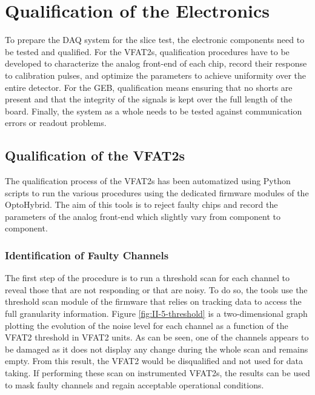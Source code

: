 \chapter{Qualification of the Electronics}
\label{chap:II-5-qualification}

  To prepare the DAQ system for the slice test, the electronic components need to be tested and qualified. For the VFAT2s, qualification procedures have to be developed to characterize the analog front-end of each chip, record their response to calibration pulses, and optimize the parameters to achieve uniformity over the entire detector. For the GEB, qualification means ensuring that no shorts are present and that the integrity of the signals is kept over the full length of the board. Finally, the system as a whole needs to be tested against communication errors or readout problems.

  \section{Qualification of the VFAT2s}

    The qualification process of the VFAT2s has been automatized using Python scripts to run the various procedures using the dedicated firmware modules of the OptoHybrid. The aim of this tools is to reject faulty chips and record the parameters of the analog front-end which slightly vary from component to component.

    \subsection{Identification of Faulty Channels}

      The first step of the procedure is to run a threshold scan for each channel to reveal those that are not responding or that are noisy. To do so, the tools use the threshold scan module of the firmware that relies on tracking data to access the full granularity information. Figure \ref{fig:II-5-threshold} is a two-dimensional graph plotting the evolution of the noise level for each channel as a function of the VFAT2 threshold in VFAT2 units. As can be seen, one of the channels appears to be damaged as it does not display any change during the whole scan and remains empty. From this result, the VFAT2 would be disqualified and not used for data taking. If performing these scan on instrumented VFAT2s, the results can be used to mask faulty channels and regain acceptable operational conditions.

